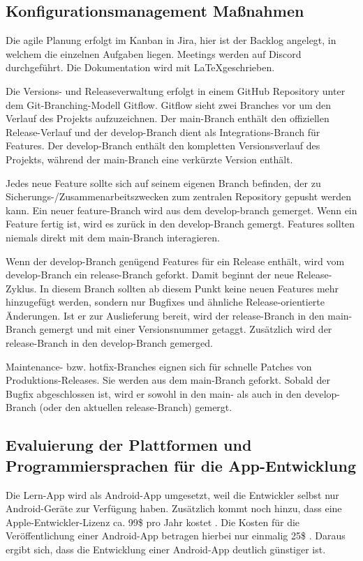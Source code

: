 \subsection{Konfigurationsmanagement Maßnahmen}
Die agile Planung erfolgt im Kanban in Jira, hier ist der Backlog angelegt, in welchem die einzelnen Aufgaben liegen. Meetings werden auf Discord durchgeführt. Die Dokumentation wird mit \LaTeX  geschrieben.\newline

\noindent
Die Versions- und Releaseverwaltung erfolgt in einem GitHub Repository unter dem Git-Branching-Modell Gitflow. Gitflow sieht zwei Branches vor um den Verlauf des Projekts aufzuzeichnen. Der main-Branch enthält den offiziellen Release-Verlauf und der develop-Branch dient als Integrations-Branch für Features. Der develop-Branch enthält den kompletten Versionsverlauf des Projekts, während der main-Branch eine verkürzte Version enthält.

\newpage
\noindent
Jedes neue Feature sollte sich auf seinem eigenen Branch befinden, der zu \\ Sicherungs-/Zusammenarbeitszwecken zum zentralen Repository gepusht werden kann. Ein neuer feature-Branch  wird aus dem develop-branch gemerget. Wenn ein Feature fertig ist, wird es zurück in den develop-Branch gemergt. Features sollten niemals direkt mit dem main-Branch interagieren.\newline

\noindent
Wenn der develop-Branch genügend Features für ein Release enthält, wird vom develop-Branch ein release-Branch geforkt. Damit beginnt der neue Release-Zyklus. In diesem Branch sollten ab diesem Punkt keine neuen Features mehr hinzugefügt werden, sondern nur Bugfixes und ähnliche Release-orientierte Änderungen. Ist er zur Auslieferung bereit, wird der release-Branch in den main-Branch gemergt und mit einer Versionsnummer getaggt. Zusätzlich wird der release-Branch in den develop-Branch gemerged. \newline

\noindent
Maintenance- bzw. hotfix-Branches eignen sich für schnelle Patches von Produktions-Releases. Sie werden aus dem main-Branch geforkt. Sobald der Bugfix abgeschlossen ist, wird er sowohl in den main- als auch in den develop-Branch (oder den aktuellen release-Branch) gemergt.
\subsection{Evaluierung der Plattformen und Programmiersprachen für die App-Entwicklung
}
Die Lern-App  wird als Android-App umgesetzt, weil die Entwickler selbst nur Android-Geräte zur Verfügung haben. Zusätzlich kommt noch hinzu, dass eine Apple-Entwickler-Lizenz ca. 99\$ pro Jahr kostet \cite{noauthor_registrierung_nodate}. Die Kosten für die Veröffentlichung einer Android-App betragen hierbei nur einmalig 25\$ \cite {appsoluts_unterschied_2016}. Daraus ergibt sich, dass die Entwicklung einer Android-App deutlich günstiger ist. \\

